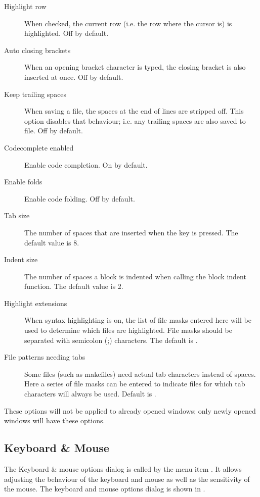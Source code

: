\begin{description}
\item[Highlight row]
When checked, the current row (i.e. the row where the cursor is) is
highlighted. Off by default.
\item[Auto closing brackets]
When an opening bracket character is typed, the closing bracket is also
inserted at once. Off by default.
\item[Keep trailing spaces]
When saving a file, the spaces at the end of lines are stripped off. This
option disables that behaviour; i.e. any trailing spaces are also saved
to file. Off by default.
\item[Codecomplete enabled]
Enable code completion. On by default.
\item[Enable folds]
Enable code folding. Off by default.
\item[Tab size]
The number of spaces that are inserted when the  key is pressed.
The default value is 8.
\item[Indent size]
The number of spaces a block is indented when calling the block indent function.
The default value is 2.
\item[Highlight extensions]
When syntax highlighting is on, the list of file masks entered here will be
used to determine which files are highlighted. File masks should be
separated with semicolon (;) characters. The default is
.
\item[File patterns needing tabs]
Some files (such as makefiles) need actual tab characters instead of spaces.
Here a series of file masks can be entered to indicate files for which tab 
characters will always be used. Default is .
\end{description}
\begin{remark}
These options will not be applied to already opened windows; only newly
opened windows will have these options.
\end{remark}
%
%
\subsection{Keyboard \& Mouse}
\label{se:prefmouse}
The Keyboard \& mouse options dialog is called by the menu item
. It allows adjusting the behaviour of the
keyboard and mouse as well as the sensitivity of the mouse.
The keyboard and mouse options dialog is shown in .


